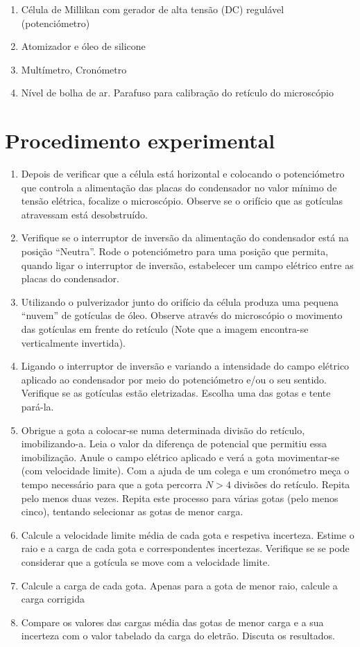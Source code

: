 \documentclass[a4paper,twoside,12pt]{article}      %
\begin{document}
\begin{enumerate}
	\item Célula de Millikan com gerador de alta tensão (DC) regulável (potenciómetro) 
	\item  Atomizador e óleo de silicone 
	\item Multímetro, Cronómetro 
	\item Nível de bolha de ar. Parafuso para calibração do retículo do microscópio
\end{enumerate}
\section{\sf Procedimento experimental}

\begin{enumerate}
\item   Depois de verificar que a célula está horizontal e colocando o potenciómetro que 
controla a alimentação das placas do condensador no valor mínimo de tensão elétrica,
focalize o microscópio. Observe se o orifício que as gotículas atravessam está 
desobstruído.
\item    Verifique se o interruptor de inversão da alimentação do condensador está na posição ``Neutra''.
Rode o potenciómetro para uma posição que permita, quando ligar o interruptor de inversão, estabelecer um campo elétrico entre as placas do condensador. 
\item     Utilizando o pulverizador junto do orifício da célula produza uma pequena ``nuvem'' %
de gotículas de óleo. Observe através do microscópio o movimento das gotículas em 
frente do retículo (Note que a imagem encontra-se verticalmente invertida).
\item     Ligando o interruptor de inversão e variando a intensidade do campo elétrico  aplicado ao condensador por meio do 
potenciómetro e/ou o seu sentido. Verifique se as gotículas estão eletrizadas. Escolha uma das gotas e tente pará-la.
 \item Obrigue a gota a colocar-se numa determinada divisão do retículo, imobilizando-a. 
Leia o valor da diferença de potencial que permitiu essa imobilização. Anule o 
campo elétrico aplicado e verá a gota movimentar-se (com velocidade limite). Com a ajuda de um colega e um 
cronómetro meça o tempo necessário para que a gota percorra  $N>4$ divisões
do retículo. Repita pelo menos duas vezes. Repita este processo para várias gotas (pelo 
menos cinco), tentando selecionar as gotas de menor carga.
\item   Calcule a velocidade limite média de cada gota e respetiva incerteza. Estime o raio e 
a carga de cada gota e correspondentes incertezas. Verifique se se pode considerar 
que a gotícula se move com a velocidade limite.
\item Calcule a carga de cada gota. Apenas para a gota de menor raio, calcule a carga corrigida
\item   Compare os valores das cargas média das gotas de menor carga  e a sua incerteza com o valor  tabelado da carga do eletrão. Discuta os resultados.
\end{enumerate}



\end{document}
